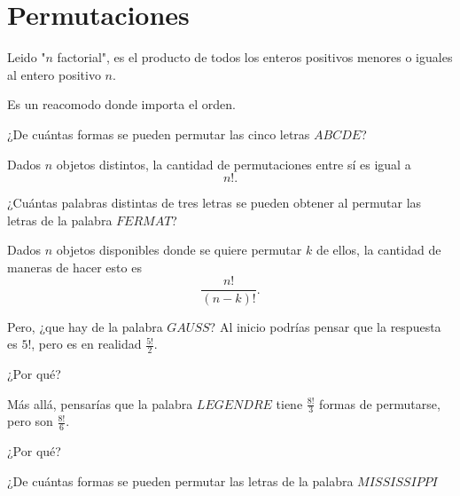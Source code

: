 \section{Permutaciones}

\begin{definition}[$n!$]
    Leido "$n$ factorial", es el producto de todos los enteros 
    positivos menores o iguales al entero positivo $n$.
\end{definition}

\begin{definition}[Permutación]
    Es un reacomodo donde importa el orden.
\end{definition}

\begin{example}
    ¿De cuántas formas se pueden permutar las cinco letras 
    $ABCDE$?
\end{example}

\begin{theorem}
    Dados $n$ objetos distintos, la cantidad de permutaciones 
    entre sí es igual a 
    \[n!.\]
\end{theorem}

\begin{example}
    ¿Cuántas palabras distintas de tres letras se pueden 
    obtener al permutar las letras de la palabra $FERMAT$?
\end{example}

\begin{theorem}
    Dados $n$ objetos disponibles donde se quiere permutar $k$ 
    de ellos, la cantidad de maneras de hacer esto es 
    \[\frac{n!}{(n-k)!}.\]
\end{theorem}

Pero, ¿que hay de la palabra $GAUSS$? Al inicio podrías pensar 
que la respuesta es $5!$, pero es en realidad $\frac{5!}{2}$.

\begin{question}
    ¿Por qué?    
\end{question}

Más allá, pensarías que la palabra $LEGENDRE$ tiene 
$\frac{8!}{3}$ formas de permutarse, pero son $\frac{8!}{6}$.

\begin{question}
    ¿Por qué?    
\end{question}

\begin{example}
    ¿De cuántas formas se pueden permutar las letras de la 
    palabra $MISSISSIPPI$
\end{example}

